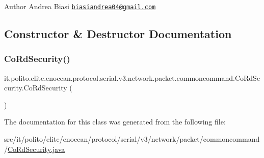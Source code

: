 \begin{DoxyAuthor}{Author}
Andrea Biasi \href{mailto:biasiandrea04@gmail.com}{\tt biasiandrea04@gmail.\+com} 
\end{DoxyAuthor}


\subsection{Constructor \& Destructor Documentation}
\hypertarget{classit_1_1polito_1_1elite_1_1enocean_1_1protocol_1_1serial_1_1v3_1_1network_1_1packet_1_1commoncommand_1_1_co_rd_security_a09abd70ed63c450515e3e7701c61bf0c}{}\label{classit_1_1polito_1_1elite_1_1enocean_1_1protocol_1_1serial_1_1v3_1_1network_1_1packet_1_1commoncommand_1_1_co_rd_security_a09abd70ed63c450515e3e7701c61bf0c} 
\subsubsection{\texorpdfstring{Co\+Rd\+Security()}{CoRdSecurity()}}
{\footnotesize\ttfamily it.\+polito.\+elite.\+enocean.\+protocol.\+serial.\+v3.\+network.\+packet.\+commoncommand.\+Co\+Rd\+Security.\+Co\+Rd\+Security (\begin{DoxyParamCaption}{ }\end{DoxyParamCaption})}



The documentation for this class was generated from the following file\+:\begin{DoxyCompactItemize}
\item 
src/it/polito/elite/enocean/protocol/serial/v3/network/packet/commoncommand/\hyperlink{_co_rd_security_8java}{Co\+Rd\+Security.\+java}\end{DoxyCompactItemize}
